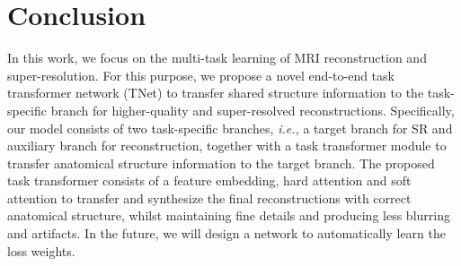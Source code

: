 \documentclass[runningheads]{llncs}
\newcommand{\ie}[1]{\textit{i.e.,}}
\begin{document}
\section{Conclusion}
In this work, we focus on the multi-task learning of MRI reconstruction and super-resolution. For this purpose, we propose a novel end-to-end task transformer network (TNet) to transfer shared structure information to the task-specific branch for higher-quality and super-resolved reconstructions. Specifically, our model consists of two task-specific branches, \ie, a target branch for SR and auxiliary branch for reconstruction, together with a task transformer module to transfer anatomical structure information to the target branch. The proposed task transformer consists of a feature embedding, hard attention and soft attention to transfer and synthesize the final reconstructions with correct anatomical structure, whilst maintaining fine details and producing less blurring and artifacts. In the future, we will design a network to automatically learn the loss weights.









\end{document}
